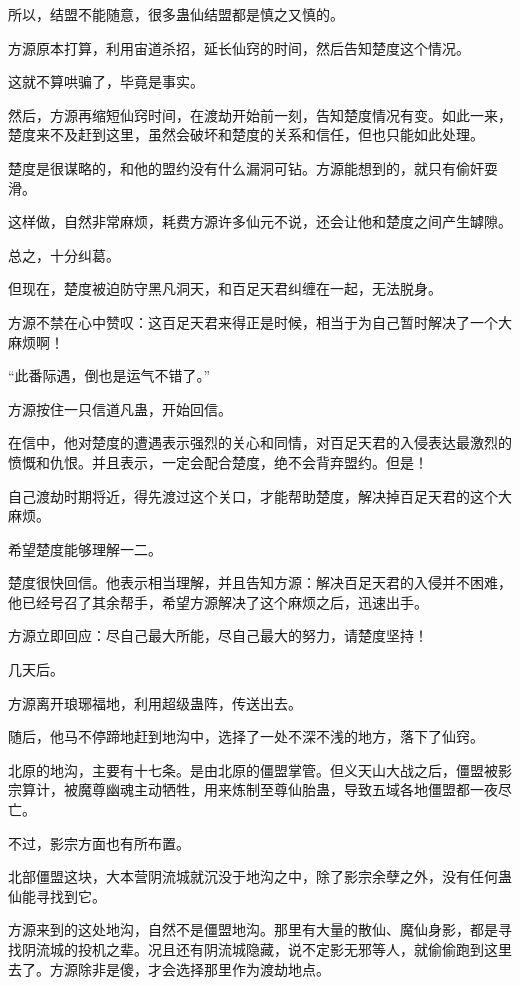 \begin{this_body}
所以，结盟不能随意，很多蛊仙结盟都是慎之又慎的。

方源原本打算，利用宙道杀招，延长仙窍的时间，然后告知楚度这个情况。

这就不算哄骗了，毕竟是事实。

然后，方源再缩短仙窍时间，在渡劫开始前一刻，告知楚度情况有变。如此一来，楚度来不及赶到这里，虽然会破坏和楚度的关系和信任，但也只能如此处理。

楚度是很谋略的，和他的盟约没有什么漏洞可钻。方源能想到的，就只有偷奸耍滑。

这样做，自然非常麻烦，耗费方源许多仙元不说，还会让他和楚度之间产生罅隙。

总之，十分纠葛。

但现在，楚度被迫防守黑凡洞天，和百足天君纠缠在一起，无法脱身。

方源不禁在心中赞叹：这百足天君来得正是时候，相当于为自己暂时解决了一个大麻烦啊！

“此番际遇，倒也是运气不错了。”

方源按住一只信道凡蛊，开始回信。

在信中，他对楚度的遭遇表示强烈的关心和同情，对百足天君的入侵表达最激烈的愤慨和仇恨。并且表示，一定会配合楚度，绝不会背弃盟约。但是！

自己渡劫时期将近，得先渡过这个关口，才能帮助楚度，解决掉百足天君的这个大麻烦。

希望楚度能够理解一二。

楚度很快回信。他表示相当理解，并且告知方源：解决百足天君的入侵并不困难，他已经号召了其余帮手，希望方源解决了这个麻烦之后，迅速出手。

方源立即回应：尽自己最大所能，尽自己最大的努力，请楚度坚持！

几天后。

方源离开琅琊福地，利用超级蛊阵，传送出去。

随后，他马不停蹄地赶到地沟中，选择了一处不深不浅的地方，落下了仙窍。

北原的地沟，主要有十七条。是由北原的僵盟掌管。但义天山大战之后，僵盟被影宗算计，被魔尊幽魂主动牺牲，用来炼制至尊仙胎蛊，导致五域各地僵盟都一夜尽亡。

不过，影宗方面也有所布置。

北部僵盟这块，大本营阴流城就沉没于地沟之中，除了影宗余孽之外，没有任何蛊仙能寻找到它。

方源来到的这处地沟，自然不是僵盟地沟。那里有大量的散仙、魔仙身影，都是寻找阴流城的投机之辈。况且还有阴流城隐藏，说不定影无邪等人，就偷偷跑到这里去了。方源除非是傻，才会选择那里作为渡劫地点。


\end{this_body}
